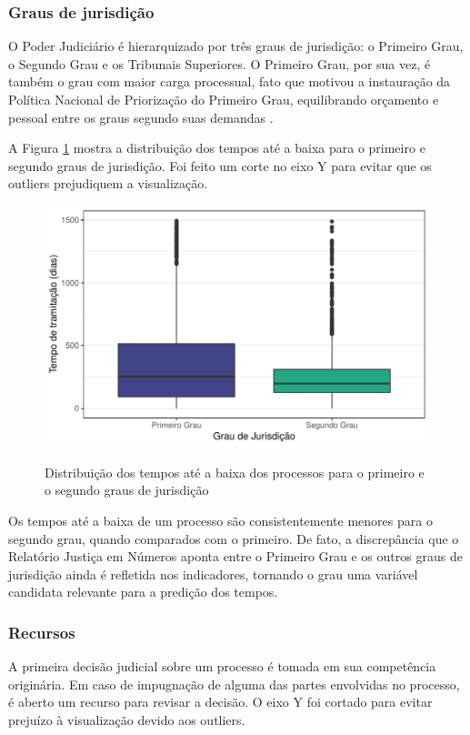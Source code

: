 \subsubsection{Graus de jurisdição\label{sec:graus}}
O Poder Judiciário é hierarquizado por três graus de jurisdição: o Primeiro Grau, o Segundo Grau e os Tribunais Superiores. O Primeiro Grau, por sua vez, é também o grau com maior carga processual, fato que motivou a instauração da Política Nacional de Priorização do Primeiro Grau, equilibrando orçamento e pessoal entre os graus segundo suas demandas \cite{justicaemnumeros}.

A Figura \ref{fig:grau_tempo} mostra a distribuição dos tempos até a baixa para o primeiro e segundo graus de jurisdição. Foi feito um corte no eixo Y para evitar que os outliers prejudiquem a visualização.

\begin{figure}[H]
    \centering
    \caption{Distribuição dos tempos até a baixa dos processos para o primeiro e o segundo graus de jurisdição}
    \includegraphics[scale=1]{imagens/grau_tempo.pdf}
    \label{fig:grau_tempo}
\end{figure}

Os tempos até a baixa de um processo são consistentemente menores para o segundo grau, quando comparados com o primeiro. De fato, a discrepância que o Relatório Justiça em Números aponta entre o Primeiro Grau e os outros graus de jurisdição ainda é refletida nos indicadores, tornando o grau uma variável candidata relevante para a predição dos tempos.

\subsubsection{Recursos\label{sec:recursos}}
A primeira decisão judicial sobre um processo é tomada em sua competência originária. Em caso de impugnação de alguma das partes envolvidas no processo, é aberto um recurso para revisar a decisão. O eixo Y foi cortado para evitar prejuízo à visualização devido aos outliers.

